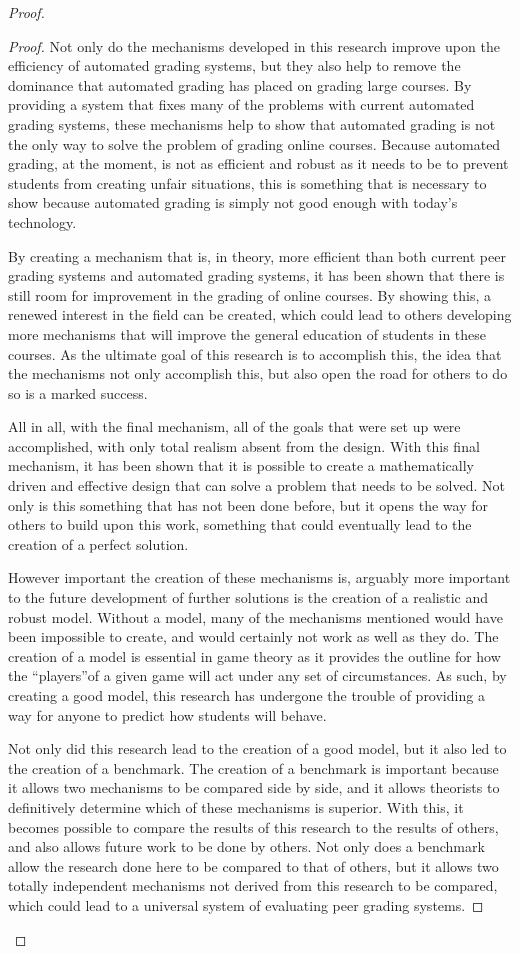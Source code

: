\documentclass[12pt, Arial]{article}
\begin{document}
\begin{proof}
\begin{proof}
Not only do the mechanisms developed in this research improve upon the efficiency of automated grading systems, but they also help to remove the dominance that automated grading has placed on grading large courses. By providing a system that fixes many of the problems with current automated grading systems, these mechanisms help to show that automated grading is not the only way to solve the problem of grading online courses. Because automated grading, at the moment, is not as efficient and robust as it needs to be to prevent students from creating unfair situations, this is something that is necessary to show because automated grading is simply not good enough with today's technology.

By creating a mechanism that is, in theory, more efficient than both current peer grading systems and automated grading systems, it has been shown that there is still room for improvement in the grading of online courses. By showing this, a renewed interest in the field can be created, which could lead to others developing more mechanisms that will improve the general education of students in these courses. As the ultimate goal of this research is to accomplish this, the idea that the mechanisms not only accomplish this, but also open the road for others to do so is a marked success.

All in all, with the final mechanism, all of the goals that were set up were accomplished, with only total realism absent from the design. With this final mechanism, it has been shown that it is possible to create a mathematically driven and effective design that can solve a problem that needs to be solved. Not only is this something that has not been done before, but it opens the way for others to build upon this work, something that could eventually lead to the creation of a perfect solution. 

However important the creation of these mechanisms is, arguably more important to the future development of further solutions is the creation of a realistic and robust model. Without a model, many of the mechanisms mentioned would have been impossible to create, and would certainly not work as well as they do. The creation of a model is essential in game theory as it provides the outline for how the ``players''of a given game will act under any set of circumstances. As such, by creating a good model, this research has undergone the trouble of providing a way for anyone to predict how students will behave. 

Not only did this research lead to the creation of a good model, but it also led to the creation of a benchmark. The creation of a benchmark is important because it allows two mechanisms to be compared side by side, and it allows theorists to definitively determine which of these mechanisms is superior. With this, it becomes possible to compare the results of this research to the results of others, and also allows future work to be done by others. Not only does a benchmark allow the research done here to be compared to that of others, but it allows two totally independent mechanisms not derived from this research to be compared, which could lead to a universal system of evaluating peer grading systems.


\end{proof}
\end{proof}
\end{document}
